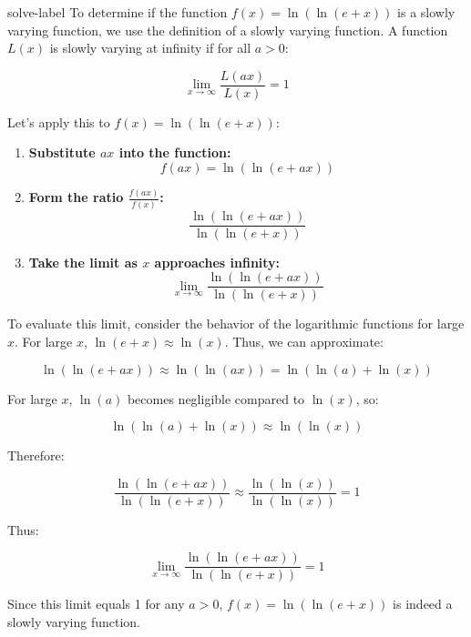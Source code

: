 	\begin{solve}{}{solve-label}
	To determine if the function \( f(x) = \ln(\ln(e+x)) \) is a slowly varying function, we use the definition of a slowly varying function. A function \( L(x) \) is slowly varying at infinity if for all \( a > 0 \):
	
	$$ \lim_{x \to \infty} \frac{L(ax)}{L(x)} = 1 $$
	
	Let's apply this to \( f(x) = \ln(\ln(e+x)) \):
	\begin{enumerate}
		\item \textbf{Substitute \( ax \) into the function:}
	$$f(ax) = \ln(\ln(e+ax))$$
	
	\item \textbf{Form the ratio \( \frac{f(ax)}{f(x)} \):}
	$$\frac{\ln(\ln(e+ax))}{\ln(\ln(e+x))}$$
	\item \textbf{Take the limit as \( x \) approaches infinity:}
	$$\lim_{x \to \infty} \frac{\ln(\ln(e+ax))}{\ln(\ln(e+x))}$$
	\end{enumerate}
	To evaluate this limit, consider the behavior of the logarithmic functions for large \( x \). For large \( x \), \( \ln(e+x) \approx \ln(x) \). Thus, we can approximate:
	
	\[
	\ln(\ln(e+ax)) \approx \ln(\ln(ax)) = \ln(\ln(a) + \ln(x))
	\]
	
	For large \( x \), \( \ln(a) \) becomes negligible compared to \( \ln(x) \), so:
	
	\[
	\ln(\ln(a) + \ln(x)) \approx \ln(\ln(x))
	\]
	
	Therefore:
	
	\[
	\frac{\ln(\ln(e+ax))}{\ln(\ln(e+x))} \approx \frac{\ln(\ln(x))}{\ln(\ln(x))} = 1
	\]
	
	Thus:
	
	\[
	\lim_{x \to \infty} \frac{\ln(\ln(e+ax))}{\ln(\ln(e+x))} = 1
	\]
	
	Since this limit equals 1 for any \( a > 0 \), \( f(x) = \ln(\ln(e+x)) \) is indeed a slowly varying function.
	\cite{r1,r2,r3,r4,r5,r6,r7,r8,r9,r10}
	\end{solve}
	
	
	
	
	
